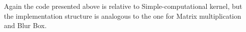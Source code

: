 	Again the code presented above is relative to Simple-computational kernel, but the implementation structure is analogous to the one for Matrix multiplication and Blur Box.
	
	
	



